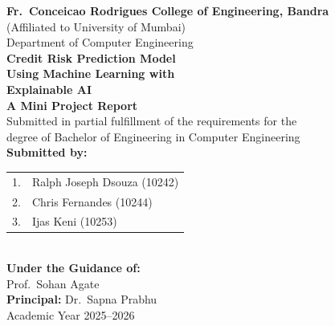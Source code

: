 \documentclass[12pt,a4paper]{report}
\begin{document}
\begin{titlepage}
\centering
\vspace*{1cm}
{\large\textbf{Fr.\ Conceicao Rodrigues College of Engineering, Bandra}\\[0.3cm]}
{\normalsize (Affiliated to University of Mumbai)\\[0.2cm]}
{\normalsize Department of Computer Engineering\\[1.5cm]}
{\Huge\bfseries Credit Risk Prediction Model\\[0.3cm]}
{\Large\bfseries Using Machine Learning with\\Explainable AI\\[1.5cm]}
{\large\textbf{A Mini Project Report}\\[0.2cm]}
{\normalsize Submitted in partial fulfillment of the requirements for the\\
degree of Bachelor of Engineering in Computer Engineering\\[1.5cm]}
{\large\textbf{Submitted by:}\\[0.4cm]}
\begin{tabular}{l l}
1. & Ralph Joseph Dsouza (10242) \\
2. & Chris Fernandes (10244) \\
3. & Ijas Keni (10253) \\
\end{tabular}\\[1.5cm]
{\large\textbf{Under the Guidance of:}\\[0.3cm]}
Prof.\ Sohan Agate\\[1.5cm]
{\large\textbf{Principal:} Dr.\ Sapna Prabhu\\[1cm]}
{\large Academic Year 2025--2026\\}
\end{titlepage}
\end{document}
